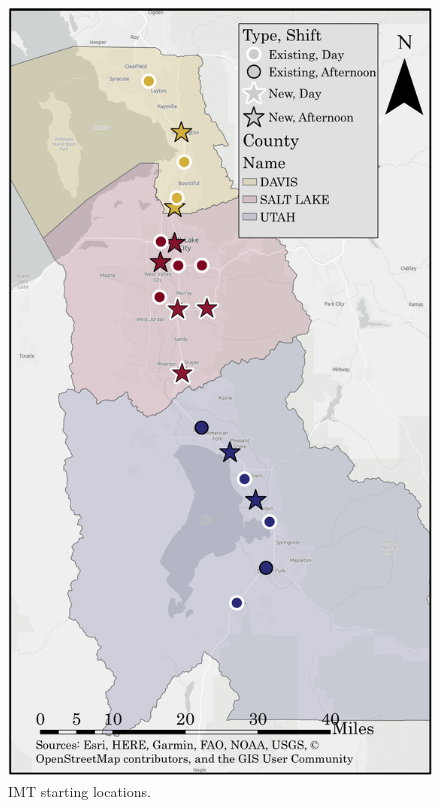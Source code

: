 \documentclass[fancy, oneside, mastersfancy, ms]{byuthesis}
\begin{document}
\begin{figure}

{\centering \includegraphics{figures/imt_gray_map.png}

}

\caption{\label{fig-IMT_Map}IMT starting locations.}

\end{figure}
\end{document}
